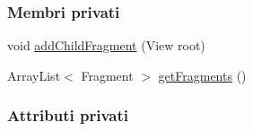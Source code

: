 \subsubsection*{Membri privati}
\begin{DoxyCompactItemize}
\item 
void \hyperlink{classit_1_1unibo_1_1torsello_1_1bluetoothpositioning_1_1fragment_1_1DeviceDetailInner0Fragment_af00be470ccce3ed7d2f1831ef7dbf307_af00be470ccce3ed7d2f1831ef7dbf307}{add\+Child\+Fragment} (View root)
\item 
Array\+List$<$ Fragment $>$ \hyperlink{classit_1_1unibo_1_1torsello_1_1bluetoothpositioning_1_1fragment_1_1DeviceDetailInner0Fragment_a8cec7494e43938243befe1397abdda05_a8cec7494e43938243befe1397abdda05}{get\+Fragments} ()
\end{DoxyCompactItemize}
\subsubsection*{Attributi privati}
